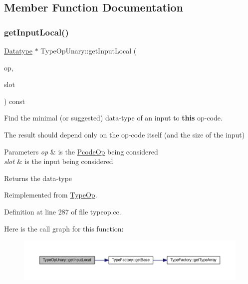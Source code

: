 \subsection{Member Function Documentation}
\mbox{\label{class_type_op_unary_a80df02d6ff2783f44b3c9dca6f580044}} 
\subsubsection{\texorpdfstring{getInputLocal()}{getInputLocal()}}
{\footnotesize\ttfamily \mbox{\hyperlink{class_datatype}{Datatype}} $\ast$ Type\+Op\+Unary\+::get\+Input\+Local (\begin{DoxyParamCaption}\item[{const \mbox{\hyperlink{class_pcode_op}{Pcode\+Op}} $\ast$}]{op,  }\item[{int4}]{slot }\end{DoxyParamCaption}) const\hspace{0.3cm}{\ttfamily [virtual]}}



Find the minimal (or suggested) data-\/type of an input to {\bfseries{this}} op-\/code. 

The result should depend only on the op-\/code itself (and the size of the input) 
\begin{DoxyParams}{Parameters}
{\em op} & is the \mbox{\hyperlink{class_pcode_op}{Pcode\+Op}} being considered \\
\hline
{\em slot} & is the input being considered \\
\hline
\end{DoxyParams}
\begin{DoxyReturn}{Returns}
the data-\/type 
\end{DoxyReturn}


Reimplemented from \mbox{\hyperlink{class_type_op_abe2e4b619932cf94bafb084963a0fc66}{Type\+Op}}.



Definition at line 287 of file typeop.\+cc.

Here is the call graph for this function\+:
\nopagebreak
\begin{figure}[H]
\begin{center}
\leavevmode
\includegraphics[width=350pt]{class_type_op_unary_a80df02d6ff2783f44b3c9dca6f580044_cgraph}
\end{center}
\end{figure}
\mbox{\label{class_type_op_unary_a33872e1381109a5fdb1030a2771e0c6e}} 
